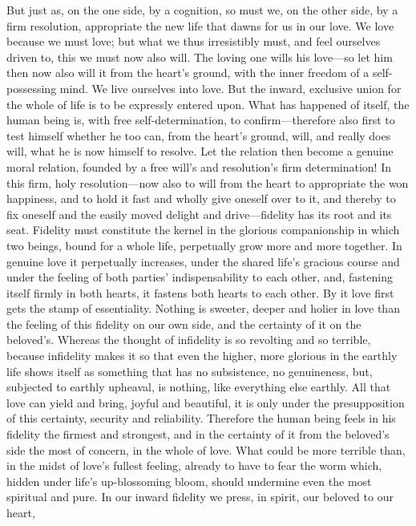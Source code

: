 \documentclass[12pt,a4paper]{book}
\begin{document}
But just as, on the one side, by a cognition, so must we, on the other
side, by a firm resolution, appropriate the new life that dawns for us in
our love. We love because we must love; but what we thus irresistibly must,
and feel ourselves driven to, this we must now also will. The loving one
wills his love---so let him then now also will it from the heart's ground,
with the inner freedom of a self-possessing mind. We live ourselves into
love. But the inward, exclusive union for the whole of life is to be
expressly entered upon. What has happened of itself, the human being is,
with free self-determination, to confirm---therefore also first to test
himself whether he too can, from the heart's ground, will, and really does
will, what he is now himself to resolve. Let the relation then become a
genuine moral relation, founded by a free will's and resolution's firm
determination! In this firm, holy resolution---now also to will from the
heart to appropriate the won happiness, and to hold it fast and wholly give
oneself over to it, and thereby to fix oneself and the easily moved delight
and drive---fidelity has its root and its seat.
Fidelity must constitute the kernel in the glorious companionship in which
two beings, bound for a whole life, perpetually grow more and more
together. In genuine love it perpetually increases, under the shared life's
gracious course and under the feeling of both parties' indispensability to
each other, and, fastening itself firmly in both hearts, it fastens both
hearts to each other. By it love first gets the stamp of essentiality.
Nothing is sweeter, deeper and holier in love than the feeling of this
fidelity on our own side, and the certainty of it on the beloved's.
Whereas the thought of infidelity is so revolting and so terrible, because
infidelity makes it so that even the higher, more glorious in the earthly
life shows itself as something that has no subsistence, no genuineness,
but, subjected to earthly upheaval, is nothing, like everything else
earthly. All that love can yield and bring, joyful and beautiful, it is
only under the presupposition of this certainty, security and reliability.
Therefore the human being feels in his fidelity the firmest and strongest,
and in the certainty of it from the beloved's side the most of concern, in
the whole of love. What could be more terrible than, in the midst of love's
fullest feeling, already to have to fear the worm which, hidden under
life's up-blossoming bloom, should undermine even the most spiritual and
pure. In our inward fidelity we press, in spirit, our beloved to our heart,
\end{document}
